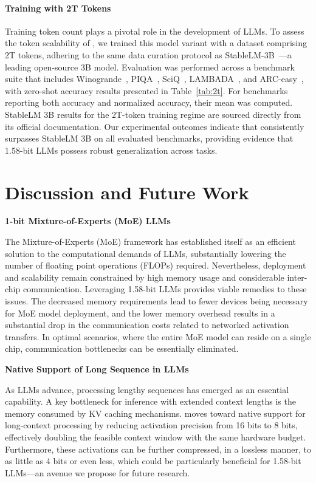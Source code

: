 \paragraph{Training with 2T Tokens}

Training token count plays a pivotal role in the development of LLMs. To assess the token scalability of , we trained this model variant with a dataset comprising 2T tokens, adhering to the same data curation protocol as StableLM-3B~\cite{StableLM-3B-4E1T}—a leading open-source 3B model. Evaluation was performed across a benchmark suite that includes Winogrande~\cite{winoGrande}, PIQA~\cite{piqa}, SciQ~\cite{sciq}, LAMBADA~\cite{lambada}, and ARC-easy~\cite{arc}, with zero-shot accuracy results presented in Table~\ref{tab:2t}. For benchmarks reporting both accuracy and normalized accuracy, their mean was computed. StableLM 3B results for the 2T-token training regime are sourced directly from its official documentation. Our experimental outcomes indicate that  consistently surpasses StableLM 3B on all evaluated benchmarks, providing evidence that 1.58-bit LLMs possess robust generalization across tasks.

\section{Discussion and Future Work}

\textbf{1-bit Mixture-of-Experts (MoE) LLMs}

The Mixture-of-Experts (MoE) framework has established itself as an efficient solution to the computational demands of LLMs, substantially lowering the number of floating point operations (FLOPs) required. Nevertheless, deployment and scalability remain constrained by high memory usage and considerable inter-chip communication. Leveraging 1.58-bit LLMs provides viable remedies to these issues. The decreased memory requirements lead to fewer devices being necessary for MoE model deployment, and the lower memory overhead results in a substantial drop in the communication costs related to networked activation transfers. In optimal scenarios, where the entire MoE model can reside on a single chip, communication bottlenecks can be essentially eliminated.

\textbf{Native Support of Long Sequence in LLMs}

As LLMs advance, processing lengthy sequences has emerged as an essential capability. A key bottleneck for inference with extended context lengths is the memory consumed by KV caching mechanisms.  moves toward native support for long-context processing by reducing activation precision from 16 bits to 8 bits, effectively doubling the feasible context window with the same hardware budget. Furthermore, these activations can be further compressed, in a lossless manner, to as little as 4 bits or even less, which could be particularly beneficial for 1.58-bit LLMs—an avenue we propose for future research.

